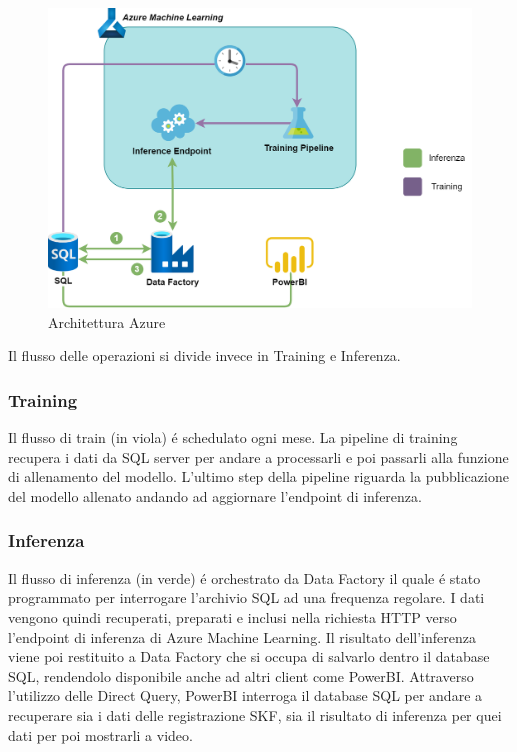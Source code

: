 \begin{figure}[t]
		
	\centering
	\includegraphics[width=14cm, scale=1]{images/deploy_scheme}
	\caption{Architettura Azure}
	\label{azure}
	
\end{figure}


Il flusso delle operazioni si divide invece in Training e Inferenza.

\subsubsection{Training}
Il flusso di train (in viola) é schedulato ogni mese. La pipeline di training recupera i dati da SQL server per andare a processarli e poi passarli alla funzione di allenamento del modello. L'ultimo step della pipeline riguarda la pubblicazione del modello allenato andando ad aggiornare l'endpoint di inferenza.

\subsubsection{Inferenza}
Il flusso di inferenza (in verde) é orchestrato da Data Factory il quale é stato programmato per interrogare l'archivio SQL ad una frequenza regolare. I dati vengono quindi recuperati, preparati e inclusi nella richiesta HTTP verso l'endpoint di inferenza di Azure Machine Learning. Il risultato dell'inferenza viene poi restituito a Data Factory che si occupa di salvarlo dentro il database SQL, rendendolo disponibile anche ad altri client come PowerBI. Attraverso l'utilizzo delle Direct Query, PowerBI interroga il database SQL per andare a recuperare sia i dati delle registrazione SKF, sia il risultato di inferenza per quei dati per poi mostrarli a video.


